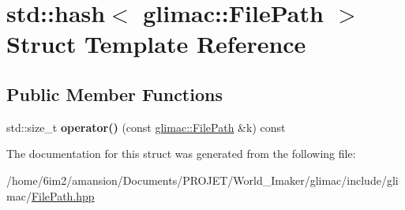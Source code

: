\hypertarget{structstd_1_1hash_3_01glimac_1_1FilePath_01_4}{}\section{std\+:\+:hash$<$ glimac\+:\+:File\+Path $>$ Struct Template Reference}
\label{structstd_1_1hash_3_01glimac_1_1FilePath_01_4}
\subsection*{Public Member Functions}
\begin{DoxyCompactItemize}
\item 
\mbox{\label{structstd_1_1hash_3_01glimac_1_1FilePath_01_4_aef106b8bc300f85d943f47f631965d37}} 
std\+::size\+\_\+t {\bfseries operator()} (const \hyperlink{classglimac_1_1FilePath}{glimac\+::\+File\+Path} \&k) const
\end{DoxyCompactItemize}


The documentation for this struct was generated from the following file\+:\begin{DoxyCompactItemize}
\item 
/home/6im2/amansion/\+Documents/\+P\+R\+O\+J\+E\+T/\+World\+\_\+\+Imaker/glimac/include/glimac/\hyperlink{FilePath_8hpp}{File\+Path.\+hpp}\end{DoxyCompactItemize}
